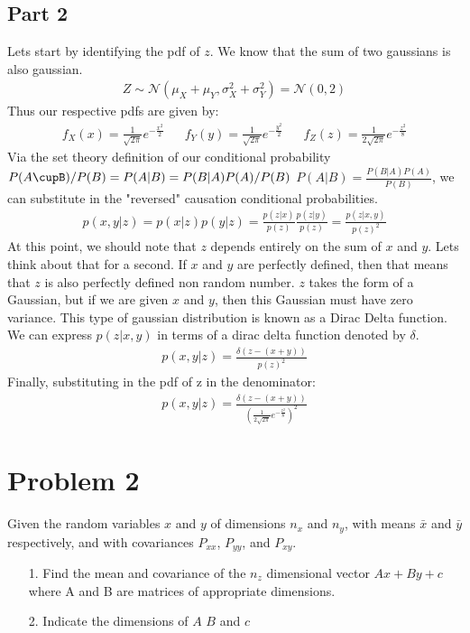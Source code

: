 \documentclass{article}
\begin{document}
\subsection*{Part 2}
Lets start by identifying the pdf of $z$. We know that the sum of two gaussians is also gaussian. 
\begin{align*}
Z \sim \mathcal{N}(\mu_X+\mu_Y, \sigma_X^2+\sigma_Y^2) = \mathcal{N}(0,2)
\end{align*}
Thus our respective pdfs are given by:
\begin{align*}
f_X(x) = \frac{1}{\sqrt{2\pi}} e^{-\frac{x^2}{2}} && f_Y(y) = \frac{1}{\sqrt{2\pi}} e^{-\frac{y^2}{2}} && f_Z(z) = \frac{1}{2\sqrt{2\pi}} e^{-\frac{z^2}{8}}
\end{align*}
Via the set theory definition of our conditional probability $P(A\cupB)/P(B) = P(A|B) = P(B|A)P(A)/P(B)$ $P(A|B) = \frac{P(B|A)P(A)}{P(B)}$, we can substitute in the "reversed" causation conditional probabilities.
\begin{align*}
p(x,y|z) = p(x|z)p(y|z) = \frac{p(z|x)}{p(z)} \frac{p(z|y)}{p(z)} = \frac{p(z|x,y)}{p(z)^2}
\end{align*}
At this point, we should note that $z$ depends entirely on the sum of $x$ and $y$. Lets think about that for a second. If $x$ and $y$ are perfectly defined, then that means that $z$ is also perfectly defined non random number. $z$ takes the form of a Gaussian, but if we are given $x$ and $y$, then this Gaussian must have zero variance. This type of gaussian distribution is known as a Dirac Delta function. We can express $p(z|x,y)$ in terms of a dirac delta function denoted by $\delta$.
\begin{align*}
p(x,y|z) = \frac{\delta(z-(x+y))}{p(z)^2}
\end{align*}
Finally, substituting in the pdf of z in the denominator:
\begin{align*}
\boxed{ p(x,y|z) = \frac{\delta(z-(x+y))}{(\frac{1}{2\sqrt{2\pi}} e^{-\frac{z^2}{8}})^2} }
\end{align*}
\clearpage
\section{Problem 2}
Given the random variables $x$ and $y$ of dimensions $n_x$ and $n_y$, with means $\bar{x}$ and $\bar{y}$ respectively, and with covariances $P_{xx}$, $P_{yy}$, and $P_{xy}$.
\begin{enumerate}
\item[1.] Find the mean and covariance of the $n_z$ dimensional vector $Ax+By+c$ where A and B are matrices of appropriate dimensions.
\item[2.] Indicate the dimensions of $A$ $B$ and $c$
\end{enumerate}
\end{document}
